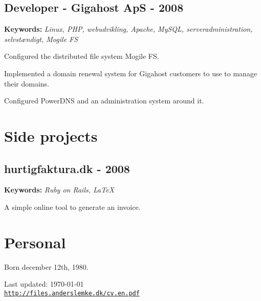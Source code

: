 \documentclass[a4paper]{article}
\renewenvironment{itemize}{
  \begin{list}{}
    { \setlength{\itemsep}{5pt}
      \setlength{\parsep}{0pt}
      \setlength{\topsep}{0pt}
      \setlength{\leftmargin}{0em} } }{
  \end{list}}
\newcommand{\keywords}[1]{\small\textbf{Keywords:} \emph{#1}\normalsize}
\begin{document}
\subsection*{Developer - Gigahost ApS - 2008}

\keywords{Linux, PHP, webudvikling, Apache, MySQL, serveradministration, selvstændigt, Mogile FS}

\begin{itemize}
  \item Configured the distributed file system Mogile FS.
  \item Implemented a domain renewal system for Gigahost customers to use to manage their domains.
  \item Configured PowerDNS and an administration system around it.
\end{itemize}

\section*{Side projects}

\subsection*{hurtigfaktura.dk - 2008}
\keywords{Ruby on Rails, \LaTeX}

A simple online tool to generate an invoice.

\section*{Personal}
Born december 12th, 1980.

\bigskip

\begin{center}
  \begin{footnotesize}
    Last updated: \today \\
    \href{http://files.anderslemke.dk/cv.en.pdf}{\tt http://files.anderslemke.dk/cv.en.pdf}
  \end{footnotesize}
\end{center}
\end{document}
